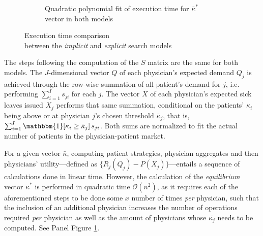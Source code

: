 \documentclass[../main.tex]{subfiles}
\begin{document}
\begin{figure}[H]
\begin{subfigure}[b]{0.45\linewidth}
        \vspace{-0.6cm}
        \caption{Quadratic polynomial fit of execution time for $\bar{\kappa}^*$  vector in both models}
        \label{fig:subfig2}
    \end{subfigure}
    \caption{Execution time comparison \\ between the \textit{implicit} and \textit{explicit} search models}
    \label{fig:comp1}
\end{figure}

The steps following the computation of the $S$ matrix are the same for both models. The $J$-dimensional vector $Q$ of each physician's expected demand $Q_j$ is achieved through the row-wise summation of all patient's demand for $j$, i.e. performing $\sum_{i=1}^{I} s_{ji}$ for each $j$. The vector $X$ of each physician's expected sick leaves issued $X_j$ performs that same summation, conditional on the patients' $\kappa_i$ being above or at physician $j$'s chosen threshold $\bar{\kappa}_j$, that is, $\sum_{i=1}^{I}  \mathbbm{1}[ \kappa_{i} \geq \bar{\kappa}_j] \, s_{ji}$. Both sums are normalized to fit the actual number of patients in the physician-patient market.

For a given vector $\bar{\kappa}$, computing patient strategies, physician aggregates and then physicians' utility—defined as $\{R_j(Q_j) - P(X_j)\}$—entails a sequence of calculations done in linear time. However, the calculation of the \textit{equilibrium} vector $\bar{\kappa}^*$ is performed in quadratic time $\mathcal{O}(n^2)$, as it requires each of the aforementioned steps to be done some $x$ number of times \textit{per} physician, such that the inclusion of an additional physician increases the number of operations required \textit{per} physician as well as the amount of physicians whose $\bar{\kappa_j}$ needs to be computed. See Panel Figure \ref{fig:subfig2}.
\end{document}
